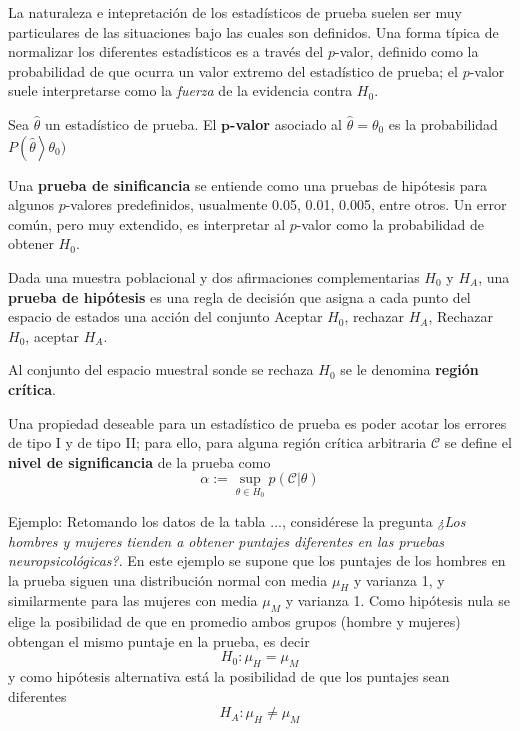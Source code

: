 La naturaleza e intepretación de los estadísticos de prueba suelen ser muy particulares de las situaciones bajo las cuales son definidos.
%
Una forma típica de normalizar los diferentes estadísticos es a través del $p$-valor, definido como la probabilidad de que ocurra un valor extremo del estadístico de prueba; 
el $p$-valor suele interpretarse como la \textit{fuerza} de la evidencia contra $H_0$.

\begin{definicion}
Sea $\widehat{\theta}$ un estadístico de prueba. El \textbf{$\boldsymbol{p}$-valor} asociado al $\widehat{\theta}=\theta_0$ es la probabilidad $P\left(\widehat{\theta}\right>\theta_0)$
\end{definicion}

Una \textbf{prueba de sinificancia} se entiende como una pruebas de hipótesis para algunos $p$-valores predefinidos, usualmente 0.05, 0.01, 0.005, entre otros.
%
Un error común, pero muy extendido, es interpretar al $p$-valor como la probabilidad de obtener $H_0$.

\begin{definicion}
Dada una muestra poblacional y dos afirmaciones complementarias $H_0$ y $H_A$, una \textbf{prueba de hipótesis} es una regla de decisión que asigna a cada punto del espacio de estados una acción del conjunto Aceptar $H_0$, rechazar $H_A$, Rechazar $H_0$, aceptar $H_A$.

Al conjunto del espacio muestral sonde se rechaza $H_0$ se le denomina \textbf{región crítica}. 
\end{definicion}

Una propiedad deseable para un estadístico de prueba es poder acotar los errores de tipo I y de tipo II; para ello, para alguna región crítica arbitraria $\mathcal{C}$ se define el \textbf{nivel de significancia} de la prueba como
\begin{equation}
\alpha := \sup_{\theta \in H_0} p(\mathcal{C} \lvert \theta)
\end{equation}

Ejemplo:
Retomando los datos de la tabla ..., considérese la pregunta \textit{¿Los hombres y mujeres tienden
a obtener puntajes diferentes en las pruebas neuropsicológicas?}. 
%
En este ejemplo se supone que los puntajes de los hombres en la prueba siguen una distribución normal con media $\mu_H$ y varianza 1, y similarmente para las mujeres con media $\mu_M$ y varianza 1.
%
Como hipótesis nula se elige la posibilidad de que en promedio ambos grupos (hombre y mujeres) obtengan el mismo puntaje en la prueba, es decir
\begin{equation}
H_0 : \mu_H = \mu_M
\end{equation}
y como hipótesis alternativa está la posibilidad de que los puntajes sean diferentes
\begin{equation}
H_A : \mu_H \neq \mu_M
\end{equation}

